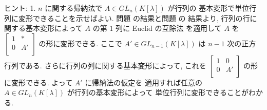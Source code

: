 \documentclass[12pt,twoside]{jarticle}
\begin{document}
\noindent
ヒント: 1. $n$ に関する帰納法で $A\in GL_n(K[\lambda])$ が行列の
基本変形で単位行列に変形できることを示せばよい. 
問題  の結果と問題  の
結果より, 行列の行に関する基本変形によって $A$ の第 $1$ 列に Euclid の互除法
を適用して $A$ を $
\begin{bmatrix}
  1 & * \\
  0 & A'\\
\end{bmatrix}$ の形に変形できる. ここで $A'\in GL_{n-1}(K[\lambda])$ 
は $n-1$ 次の正方行列である. さらに行列の列に関する基本変形によって, これを $
\begin{bmatrix}
  1 & 0  \\
  0 & A' \\
\end{bmatrix}$ の形に変形できる. よって $A'$ に帰納法の仮定を
適用すれば任意の $A\in GL_n(K[\lambda])$ が行列の基本変形によって
単位行列に変形できることがわかる.
\end{document}
